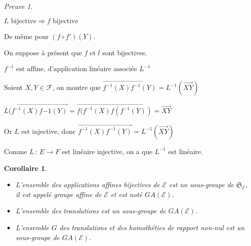 \documentclass[]{article}
\newtheorem{mycor}{Corollaire}
\theoremstyle{remark}
\newtheorem{myproof}{Preuve}
\theoremstyle{definition}
\newcommand{\funcshort}[3]{
#1 \, : \, #2 \longrightarrow #3
}
\newenvironment{proofpart}[1]{
	\noindent
	{\textbf{\boldmath #1}}
}{
	\checkmark
}
\begin{document}
\begin{myproof}
\begin{enumerate}
\begin{proofpart}{$L \text{ bijective} \Longrightarrow f \text{ bijective}$}
			De même pour $(f \circ f')(Y)$.
		\end{proofpart}

		On suppose à présent que $f$ et $l$ sont bijectives.

		\begin{proofpart}{$f^{-1} \text{ est affine, d'application linéaire associée } L^{-1}$}
		
		Soient $X, Y \in \mathcal{F}$, on montre que $\overrightarrow{f^{-1}(X)f^{-1}(Y)} = L^{-1}(\overrightarrow{XY})$
		
		$L(\overrightarrow{f^{-1}(X)f{-1}(Y)} = \overrightarrow{f(f^{-1}(X) f(f^{-1}(Y))} = \overrightarrow{XY}$
		
		Or $L$ est injective, donc $\overrightarrow{f^{-1}(X)f^{-1}(Y)} = L^{-1}(\overrightarrow{XY})$
		
		Comme $\funcshort{L}{E}{F}$ est linéaire injective, on a que $L^{-1}$ est linéaire.

		\end{proofpart}		
	\end{enumerate}
\end{myproof}

\begin{mycor}
	\leavevmode
	\begin{itemize}
		\item L'ensemble des applications affines bijectives de $\mathcal{E}$ est un sous-groupe de $\mathfrak{S}_{\mathcal{E}}$, il est appelé \textit{groupe affine de $\mathcal{E}$} et est noté $GA(\mathcal{E})$.
		
		\item L'ensemble des translations est un sous-groupe de $GA(\mathcal{E})$.
		
		\item L'ensemble $G$ des translations et des homothéties de rapport non-nul est un sous-groupe de $GA(\mathcal{E})$.
	\end{itemize}
\end{mycor}
\end{document}
